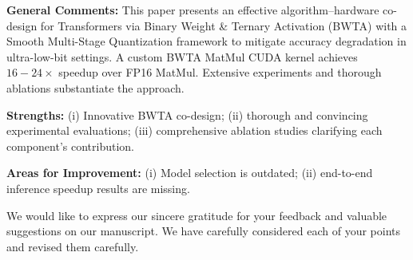 
\reviewer

\begin{generalcomment}

\textbf{General Comments:} This paper presents an effective algorithm–hardware co-design for Transformers via Binary Weight \& Ternary Activation (BWTA) with a Smooth Multi-Stage Quantization framework to mitigate accuracy degradation in ultra-low-bit settings. A custom BWTA MatMul CUDA kernel achieves $16-24\times$ speedup over FP16 MatMul. Extensive experiments and thorough ablations substantiate the approach. 

\textbf{Strengths:} (i) Innovative BWTA co-design; (ii) thorough and convincing experimental evaluations; (iii) comprehensive ablation studies clarifying each component’s contribution. 

\textbf{Areas for Improvement:} (i) Model selection is outdated; (ii) end-to-end inference speedup results are missing. 



\end{generalcomment}
\begin{revmeta}[]
We would like to express our sincere gratitude for your feedback and valuable suggestions on our manuscript. We have carefully considered each of your points and revised them carefully. 
\end{revmeta}

